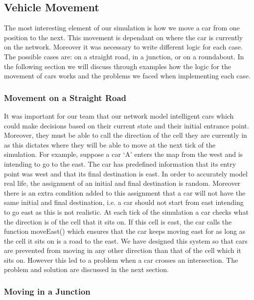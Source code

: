 \documentclass{article}
\begin{document}
\vspace{0.5cm}
 



\subsection{Vehicle Movement}\label{vehicleMovement}

The most interesting element of our simulation is how we move a car from one position to the next. This movement is dependant on where the car is currently on the network. Moreover it was necessary to write different logic for each case. The possible cases are: on a straight road, in a junction, or on a roundabout. In the following section we will discuss through examples how the logic for the movement of cars works and the problems we faced when implementing each case. 

\subsubsection{Movement on a Straight Road}
It was important for our team that our network model intelligent cars which could make decisions based on their current state and their initial entrance point. Moreover, they must be able to call the direction of the cell they are currently in as this dictates where they will be able to move at the next tick of the simulation. For example, suppose a car `A' enters the map from the west and is intending to go to the east. The car has predefined information that its entry point was west and that its final destination is east. In order to accurately model real life, the assignment of an initial and final destination is random. 
Moreover there is an extra condition added to this assignment that a car will not have the same initial and final destination, i.e. a car should not start from east intending to go east as this is not realistic. At each tick of the simulation a car checks what the  direction is of the cell that it sits on. If this cell is east, the car calls the function moveEast() which ensures that the car keeps moving east for as long as the cell it sits on is a road to the east. We have designed this system so that cars are prevented from moving in any other direction than that of the cell which it sits on. However this led to a problem when a car crosses an intersection. The problem and solution are discussed in the next section. 

\subsubsection{Moving in a Junction} \label{movementOnAJunction}
\end{document}
